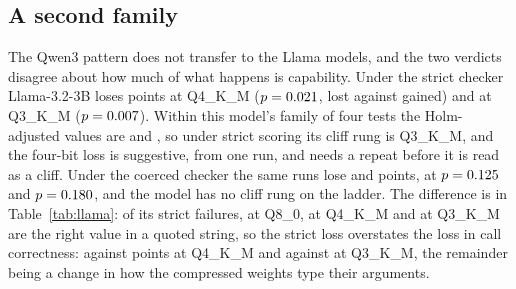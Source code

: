 \documentclass[12pt,letterpaper]{article}
\newcommand{\bfcl}{BFCL}
\newcommand{\qm}{Qwen3-1.7B}
\begin{document}
\begin{table}[t]
\centering\scriptsize\setlength{\tabcolsep}{2.5pt}

\caption{Tool calling across five models on \texttt{simple\_python}, under the strict \bfcl{} verdict and the type-coerced verdict of \S\ref{sec:problem}. \qm{} at $n=\qtN{}$ (rows from Table~\ref{tab:ladder}); the other four at $n=\qtNEightB{}$, one run per rung. Brackets after an accuracy are Wilson 95\% intervals. Each model is compared against its own Q8\_0 by McNemar's exact test; $p$ is followed by the Holm-adjusted $p$ within that model's family, in bold where the adjusted value is below 0.05. Lost/gained are for the coerced verdict.}
\label{tab:models}
\end{table}

\begin{table}[t]
\centering\footnotesize\setlength{\tabcolsep}{3.5pt}

\caption{The four-bit bound. For each model, the paired difference between Q4\_K\_M and Q8\_0 with the adjusted Wald 95\% interval of \citet{agresti2005paired}, the McNemar $p$ with the Holm-adjusted value in brackets, and the minimum detectable difference (MDD): the smallest loss the test would detect at $\alpha=0.05$ with 80\% power at the discordance observed on that model \citep{connor1987paired}. For the Qwen3 models the coerced verdict equals the strict one.}
\label{tab:fourbit}
\end{table}

\subsection{A second family}
\label{sec:family}

The Qwen3 pattern does not transfer to the Llama models, and the two verdicts disagree about how much of what happens is capability. Under the strict checker Llama-3.2-3B loses \qtDropLlamaThreeBFour{} points at Q4\_K\_M ($p=0.021{}$, \qtLostLlamaThreeBFour{} lost against \qtGainedLlamaThreeBFour{} gained) and \qtDropLlamaThreeBThree{} at Q3\_K\_M ($p=0.007{}$). Within this model's family of four tests the Holm-adjusted values are \qtPHolmLlamaThreeBFour{} and \qtPHolmLlamaThreeBThree{}, so under strict scoring its cliff rung is Q3\_K\_M, and the four-bit loss is suggestive, from one run, and needs a repeat before it is read as a cliff. Under the coerced checker the same runs lose \qtCoercedDropLlamaThreeBFour{} and \qtCoercedDropLlamaThreeBThree{} points, at $p=0.125{}$ and $p=0.180{}$, and the model has no cliff rung on the ladder. The difference is in Table~\ref{tab:llama}: of its strict failures, \qtCoercibleLlamaThreeBEight{} at Q8\_0, \qtCoercibleLlamaThreeBFour{} at Q4\_K\_M and \qtCoercibleLlamaThreeBThree{} at Q3\_K\_M are the right value in a quoted string, so the strict loss overstates the loss in call correctness: \qtDropLlamaThreeBFour{} against \qtCoercedDropLlamaThreeBFour{} points at Q4\_K\_M and \qtDropLlamaThreeBThree{} against \qtCoercedDropLlamaThreeBThree{} at Q3\_K\_M, the remainder being a change in how the compressed weights type their arguments.
\end{document}
